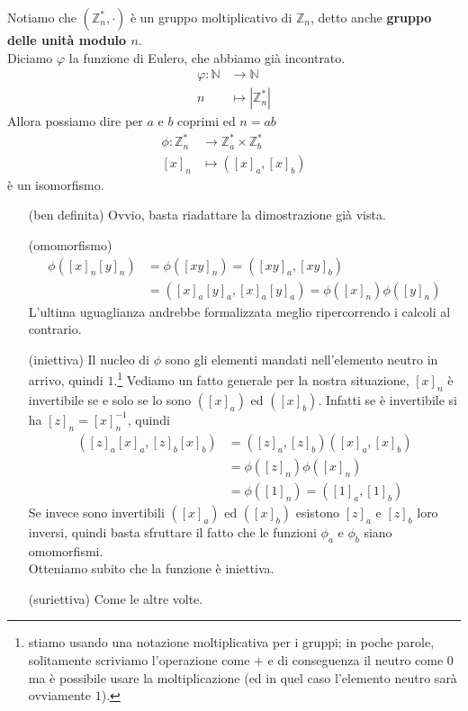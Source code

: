 \begin{osservazione}
	Notiamo che $\left(\mathbb{Z}_n^*,\cdot\right)$ è un gruppo moltiplicativo di $\mathbb{Z}_n$, detto anche \textbf{gruppo delle unità modulo $n$}. \\ Diciamo $\varphi$ la funzione di Eulero, che abbiamo già incontrato.
	\begin{align*}
	\varphi: \mathbb{N}&\longrightarrow \mathbb{N}\\
	n &\longmapsto |\mathbb{Z}_n^*|
	\end{align*}
	Allora possiamo dire per $a$ e $b$ coprimi ed $n=ab$
	\begin{align*}
	\phi:\mathbb{Z}^*_n&\longrightarrow\mathbb{Z}^*_a\times \mathbb{Z}^*_b\\
	[x]_n&\longmapsto\left([x]_a,[x]_b\right)
	\end{align*}
	è un isomorfismo.
	\begin{itemize}
		\item[(ben definita)] Ovvio, basta riadattare la dimostrazione già vista.
		\item[(omomorfismo)] 
		\begin{align*}
		\phi\left([x]_n[y]_n\right)&=\phi\left([xy]_n\right)=\left([xy]_a,[xy]_b\right)\\
		&=\left([x]_a[y]_a,[x]_a[y]_a\right)=\phi\left([x]_n\right)\phi\left([y]_n\right)
		\end{align*}
		L'ultima uguaglianza andrebbe formalizzata meglio ripercorrendo i calcoli al contrario. \\
		\item[(iniettiva)] Il nucleo di $\phi$ sono gli elementi mandati nell'elemento neutro in arrivo, quindi $1$.\footnote{stiamo usando una notazione moltiplicativa per i gruppi; in poche parole, solitamente scriviamo l'operazione come $+$ e di conseguenza il neutro come $0$ ma è possibile usare la moltiplicazione (ed in quel caso l'elemento neutro sarà ovviamente $1$).}
		Vediamo un fatto generale per la nostra situazione, $[x]_n$ è invertibile se e solo se lo sono $\left([x]_a\right)$ ed $\left([x]_b\right)$. Infatti se è invertibile si ha $[z]_n=[x]^{-1}_n$, quindi
		\begin{align*}
		\left([z]_a[x]_a,[z]_b[x]_b\right)&=\left([z]_a,[z]_b\right)\left([x]_a,[x]_b\right)\\
		&=\phi([z]_n)\phi([x]_n)\\
		&=\phi([1]_n)=\left([1]_a,[1]_b\right)
		\end{align*}
		Se invece sono invertibili $\left([x]_a\right)$ ed $\left([x]_b\right)$ esistono $[z]_a$ e $[z]_b$ loro inversi, quindi basta sfruttare il fatto che le funzioni $\phi_a$ e $\phi_b$ siano omomorfismi. \\ Otteniamo subito che la funzione è iniettiva.
		\item[(suriettiva)] Come le altre volte.
	\end{itemize}
\end{osservazione}
